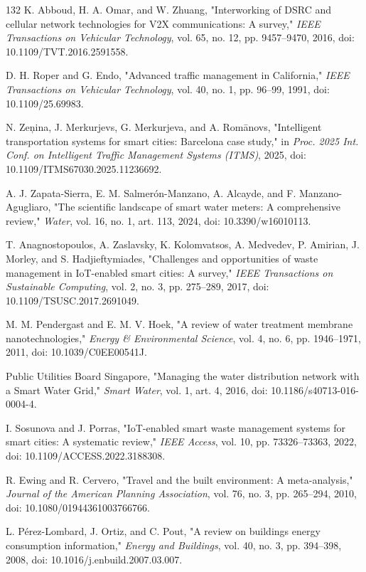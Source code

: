 \documentclass[pdflatex,sn-mathphys-num]{sn-jnl}%
\theoremstyle{thmstyleone}%
\theoremstyle{thmstyletwo}%
\theoremstyle{thmstylethree}%
\begin{document}
\begin{thebibliography}{132}
 K. Abboud, H. A. Omar, and W. Zhuang, "Interworking of DSRC and cellular network technologies for V2X communications: A survey," \emph{IEEE Transactions on Vehicular Technology}, vol. 65, no. 12, pp. 9457--9470, 2016, doi: 10.1109/TVT.2016.2591558.

 D. H. Roper and G. Endo, "Advanced traffic management in California," \emph{IEEE Transactions on Vehicular Technology}, vol. 40, no. 1, pp. 96--99, 1991, doi: 10.1109/25.69983.

 N. Ze\c{n}ina, J. Merkurjevs, G. Merkurjeva, and A. Rom\={a}novs, "Intelligent transportation systems for smart cities: Barcelona case study," in \emph{Proc. 2025 Int. Conf. on Intelligent Traffic Management Systems (ITMS)}, 2025, doi: 10.1109/ITMS67030.2025.11236692.

 A. J. Zapata-Sierra, E. M. Salmer\'on-Manzano, A. Alcayde, and F. Manzano-Agugliaro, "The scientific landscape of smart water meters: A comprehensive review," \emph{Water}, vol. 16, no. 1, art. 113, 2024, doi: 10.3390/w16010113.

 T. Anagnostopoulos, A. Zaslavsky, K. Kolomvatsos, A. Medvedev, P. Amirian, J. Morley, and S. Hadjieftymiades, "Challenges and opportunities of waste management in IoT-enabled smart cities: A survey," \emph{IEEE Transactions on Sustainable Computing}, vol. 2, no. 3, pp. 275--289, 2017, doi: 10.1109/TSUSC.2017.2691049.

 M. M. Pendergast and E. M. V. Hoek, "A review of water treatment membrane nanotechnologies," \emph{Energy \& Environmental Science}, vol. 4, no. 6, pp. 1946--1971, 2011, doi: 10.1039/C0EE00541J.

 Public Utilities Board Singapore, "Managing the water distribution network with a Smart Water Grid," \emph{Smart Water}, vol. 1, art. 4, 2016, doi: 10.1186/s40713-016-0004-4.

 I. Sosunova and J. Porras, "IoT-enabled smart waste management systems for smart cities: A systematic review," \emph{IEEE Access}, vol. 10, pp. 73326--73363, 2022, doi: 10.1109/ACCESS.2022.3188308.

 R. Ewing and R. Cervero, "Travel and the built environment: A meta-analysis," \emph{Journal of the American Planning Association}, vol. 76, no. 3, pp. 265--294, 2010, doi: 10.1080/01944361003766766.

 L. P\'erez-Lombard, J. Ortiz, and C. Pout, "A review on buildings energy consumption information," \emph{Energy and Buildings}, vol. 40, no. 3, pp. 394--398, 2008, doi: 10.1016/j.enbuild.2007.03.007.


\end{thebibliography}
\end{document}

